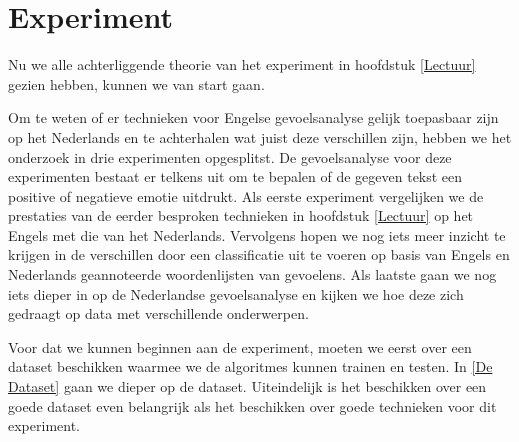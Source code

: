 \chapter{Experiment}\label{Experiment}

Nu we alle achterliggende theorie van het experiment in hoofdstuk \ref{Lectuur} gezien hebben, kunnen we van start gaan. 

Om te weten of er technieken voor Engelse gevoelsanalyse gelijk toepasbaar zijn op het Nederlands en te achterhalen wat juist deze verschillen zijn, hebben we het onderzoek in drie experimenten opgesplitst. De gevoelsanalyse voor deze experimenten bestaat er telkens uit om te bepalen of de gegeven tekst een positive of negatieve emotie uitdrukt. Als eerste experiment vergelijken we de prestaties van de eerder besproken technieken in hoofdstuk \ref{Lectuur} op het Engels met die van het Nederlands. Vervolgens hopen we nog iets meer inzicht te krijgen in de verschillen door een classificatie uit te voeren op basis van Engels en Nederlands geannoteerde woordenlijsten van gevoelens. Als laatste gaan we nog iets dieper in op de Nederlandse gevoelsanalyse en kijken we hoe deze zich gedraagt op data met verschillende onderwerpen.

Voor dat we kunnen beginnen aan de experiment, moeten we eerst over een dataset beschikken waarmee we de algoritmes kunnen trainen en testen. In \ref{De Dataset} gaan we dieper op de dataset. Uiteindelijk is het beschikken over een goede dataset even belangrijk als het beschikken over goede technieken voor dit experiment. 


